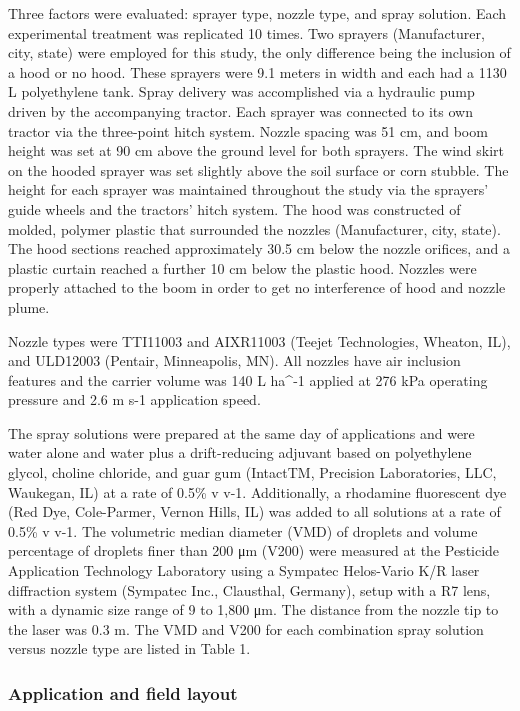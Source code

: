\documentclass[
  12pt,
  a4paper,
]{article}
\begin{document}
Three factors were evaluated: sprayer type, nozzle type, and spray
solution. Each experimental treatment was replicated 10 times. Two
sprayers (Manufacturer, city, state) were employed for this study, the
only difference being the inclusion of a hood or no hood. These sprayers
were 9.1 meters in width and each had a 1130 L polyethylene tank. Spray
delivery was accomplished via a hydraulic pump driven by the
accompanying tractor. Each sprayer was connected to its own tractor via
the three-point hitch system. Nozzle spacing was 51 cm, and boom height
was set at 90 cm above the ground level for both sprayers. The wind
skirt on the hooded sprayer was set slightly above the soil surface or
corn stubble. The height for each sprayer was maintained throughout the
study via the sprayers' guide wheels and the tractors' hitch system. The
hood was constructed of molded, polymer plastic that surrounded the
nozzles (Manufacturer, city, state). The hood sections reached
approximately 30.5 cm below the nozzle orifices, and a plastic curtain
reached a further 10 cm below the plastic hood. Nozzles were properly
attached to the boom in order to get no interference of hood and nozzle
plume.

Nozzle types were TTI11003 and AIXR11003 (Teejet Technologies, Wheaton,
IL), and ULD12003 (Pentair, Minneapolis, MN). All nozzles have air
inclusion features and the carrier volume was 140 L ha\^{}-1 applied at
276 kPa operating pressure and 2.6 m s-1 application speed.

The spray solutions were prepared at the same day of applications and
were water alone and water plus a drift-reducing adjuvant based on
polyethylene glycol, choline chloride, and guar gum (IntactTM, Precision
Laboratories, LLC, Waukegan, IL) at a rate of 0.5\% v v-1. Additionally,
a rhodamine fluorescent dye (Red Dye, Cole-Parmer, Vernon Hills, IL) was
added to all solutions at a rate of 0.5\% v v-1. The volumetric median
diameter (VMD) of droplets and volume percentage of droplets finer than
200 μm (V200) were measured at the Pesticide Application Technology
Laboratory using a Sympatec Helos-Vario K/R laser diffraction system
(Sympatec Inc., Clausthal, Germany), setup with a R7 lens, with a
dynamic size range of 9 to 1,800 μm. The distance from the nozzle tip to
the laser was 0.3 m. The VMD and V200 for each combination spray
solution versus nozzle type are listed in Table 1.

\hypertarget{application-and-field-layout}{%
\subsubsection{Application and field
layout}\label{application-and-field-layout}}
\end{document}
